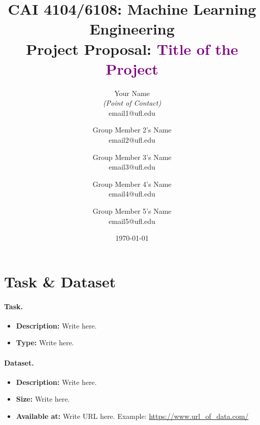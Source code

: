 \documentclass[10pt]{article}
\title{CAI 4104/6108: Machine Learning Engineering\\
	\Large Project Proposal: {\textcolor{purple}{Title of the Project}}} %
\author{
        Your Name \\{\em (Point of Contact)} \\
        email1@ufl.edu\\
        \and
        Group Member 2's Name \\
        email2@ufl.edu\\
        \and
        Group Member 3's Name \\
        email3@ufl.edu\\
        \and
        Group Member 4's Name \\
        email4@ufl.edu\\
        \and
        Group Member 5's Name \\
        email5@ufl.edu\\
}
\date{\today}
\begin{document}

\maketitle




\section*{Task \& Dataset}


\paragraph{Task.} 

\begin{itemize}

\item {\bf Description: } Write here. %

\item {\bf Type: } Write here. %

\end{itemize}

\paragraph{Dataset.} 
%
\begin{itemize}

\item {\bf Description: } Write here. %

\item {\bf Size: } Write here. %

\item {\bf Available at: } Write URL here. Example: \url{https://www.url\_of\_data.com/} %

\end{itemize}
\end{document}
